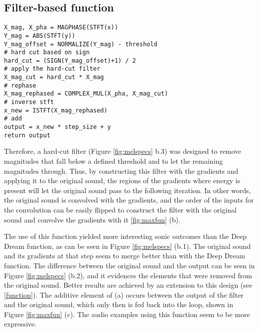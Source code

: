 \documentclass[a4paper,10pt,oneside]{article}
\begin{document}
\begin{sloppy}
\subsection{Filter-based function}

\begin{lstlisting}[caption={Filter-based function with inputs x and y}]
X_mag, X_pha = MAGPHASE(STFT(x))
Y_mag = ABS(STFT(y))
Y_mag_offset = NORMALIZE(Y_mag) - threshold
# hard cut based on sign
hard_cut = (SIGN(Y_mag_offset)+1) / 2
# apply the hard-cut filter
X_mag_cut = hard_cut * X_mag
# rephase
X_mag_rephased = COMPLEX_MUL(X_pha, X_mag_cut)
# inverse stft
x_new = ISTFT(X_mag_rephased)
# add
output = x_new * step_size + y
return output
\end{lstlisting}
\label{function}

Therefore, a hard-cut filter (Figure \ref{fig:melspecs} b.3) was designed to remove magnitudes that fall below a defined threshold and to let the remaining magnitudes through. Thus, by constructing this filter with the gradients and applying it to the original sound, the regions of the gradients where energy is present will let the original sound pass to the following iteration. In other words, the original sound is convolved with the gradients, and the order of the inputs for the convolution can be easily flipped to construct the filter with the original sound and convolve the gradients with it \ref{fig:maxfun} (b). 

The use of this function yielded more interesting sonic outcomes than the Deep Dream function, as can be seen in Figure \ref{fig:melspecs} (b.1). The original sound and its gradients at that step seem to merge better than with the Deep Dream function. The difference between the original sound and the output can be seen in Figure \ref{fig:melspecs} (b.2), and it evidences the elements that were removed from the original sound. Better results are achieved by an extension to this design (see \ref{function}). The additive element of (a) occurs between the output of the filter and the original sound, which only then is fed back into the loop, shown in Figure \ref{fig:maxfun} (c). The audio examples using this function seem to be more expressive.


\end{sloppy}
\end{document}

